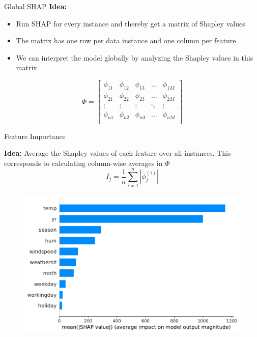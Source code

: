 \documentclass[11pt,compress,t,notes=noshow, aspectratio=169, xcolor=table]{beamer}
\begin{document}
 \begin{vbframe}{Global SHAP}
\textbf{Idea: }
\begin{itemize}
    \item Run SHAP for every instance and thereby get a matrix of Shapley values
    \item The matrix has one row per data instance and one column per feature
    \item We can interpret the model globally by analyzing the Shapley values in this matrix
\end{itemize}
\vspace{2cm}
$$
\Phi =
\begin{bmatrix}
    \phi_{11} & \phi_{12} & \phi_{13} & \dots  & \phi_{1M} \\
    \phi_{21} & \phi_{22} & \phi_{23} & \dots  & \phi_{2M} \\
    \vdots & \vdots & \vdots & \ddots & \vdots \\
    \phi_{n1} & \phi_{n2} & \phi_{n3} & \dots  & \phi_{nM} \\
\end{bmatrix}
$$

 \end{vbframe}

 \begin{vbframe}{Feature Importance}
 
\textbf{Idea:} Average the Shapley values of each feature over all instances. This corresponds to calculating column-wise averages in $\Phi$
$$
I_{j}=\frac{1}{n} \sum_{i=1}^{n}\left|\phi_{j}^{(i)}\right|
$$

\begin{figure}
    \centering
    \includegraphics[width=0.5\columnwidth]{slides/shapley/figure_man/global_shap_fi.pdf}
\end{figure}

\end{vbframe}
 
\end{document}

